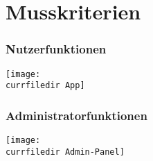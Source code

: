 \section{Musskriterien}

\begin{frame}\frametitle{Nutzerfunktionen}
    \begin{center}
    \texttt{[image: \\currfiledir App]}
    \end{center}
\end{frame}

\begin{frame}\frametitle{Administratorfunktionen}
    \begin{center}
    \texttt{[image: \\currfiledir Admin-Panel]}
    \end{center}
\end{frame}

